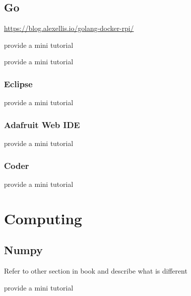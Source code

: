 \section{Go}

\url{https://blog.alexellis.io/golang-docker-rpi/}

\begin{exercise}
provide a mini tutorial 
\end{exercise}


\begin{exercise}
provide a mini tutorial 
\end{exercise}

\subsection{Eclipse}

\begin{exercise}
provide a mini tutorial 
\end{exercise}


\subsection{Adafruit Web IDE}


\begin{exercise}
provide a mini tutorial 
\end{exercise}

\subsection{Coder}


\begin{exercise}
provide a mini tutorial 
\end{exercise}

\chapter{Computing}

\section{Numpy}

Refer to other section in book and describe what is different

\begin{exercise}
provide a mini tutorial 
\end{exercise}

